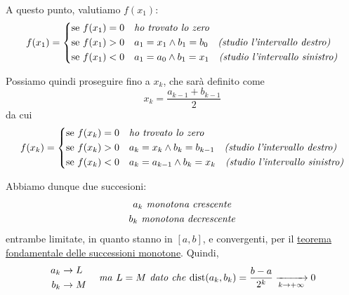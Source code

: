 \documentclass[../../dimostrazioni]{subfiles}
\begin{document}
            A questo punto, valutiamo \(f(x_1)\):
            \[
                f(x_1) =
                \left\{
                \begin{aligned}
                    &\text{se } f(x_1) = 0 && \text{\emph{ho trovato lo zero}}\\
                    &\text{se } f(x_1) > 0 && a_1 = x_1 \land b_1 = b_0 \quad \text{\emph{(studio l'intervallo destro)}}\\
                    &\text{se } f(x_1) < 0 && a_1 = a_0 \land b_1 = x_1 \quad \text{\emph{(studio l'intervallo sinistro)}}
                \end{aligned}
                \right.
            \]

            Possiamo quindi proseguire fino a \(x_k\), che sarà definito come
            \[
                x_k = \frac{a_{k - 1} + b_{k - 1}}{2}
            \]
            da cui
            \[
                f(x_k) =
                \left\{
                \begin{aligned}
                    &\text{se } f(x_k) = 0 && \text{\emph{ho trovato lo zero}}\\
                    &\text{se } f(x_k) > 0 && a_k = x_k \land b_k = b_{k - 1} \quad \text{\emph{(studio l'intervallo destro)}}\\
                    &\text{se } f(x_k) < 0 && a_k = a_{k - 1} \land b_k = x_k \quad \text{\emph{(studio l'intervallo sinistro)}}
                \end{aligned}
                \right.
            \]

            Abbiamo dunque due succesioni:
            \begin{gather*}
                a_k \text{\emph{ monotona crescente}}\\
                b_k \text{\emph{ monotona decrescente}}
            \end{gather*}
            entrambe limitate, in quanto stanno in \([a, b]\), e convergenti, per il \hyperref[teoFondSuccMono]{teorema fondamentale
            delle successioni monotone}.
            Quindi,
            \[
                \left.
                \begin{aligned}
                    a_k &\to L\\
                    b_k &\to M
                \end{aligned}
                \right.
                \quad \text{\emph{ma }} L = M \text{\emph{ dato che }} \mathrm{dist}(a_k, b_k) = \frac{b - a}{2^k} \xrightarrow[k \to +\infty]{} 0
            \]
\end{document}
